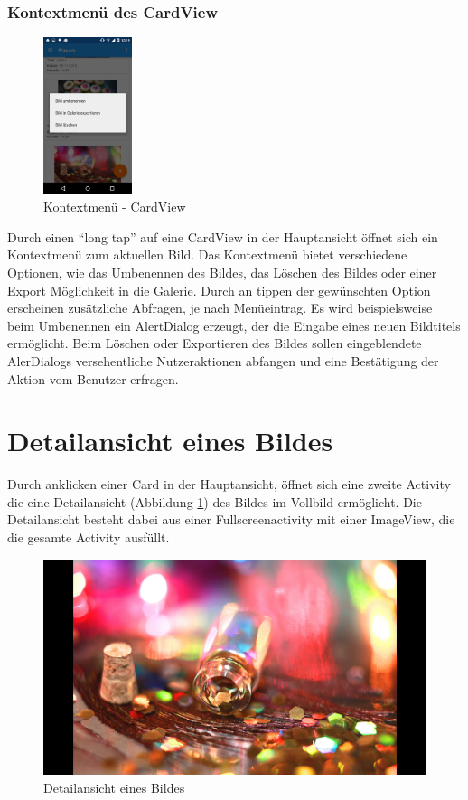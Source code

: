 \subsubsection{Kontextmenü des CardView}

\begin{figure}
	\centering
   \includegraphics[width=0.23\textwidth]{images/screenshots/contextmenu.png}
  \caption{Kontextmenü - CardView}
\end{figure}
  
Durch einen \enquote{long tap} auf eine CardView in der Hauptansicht öffnet sich ein Kontextmenü zum aktuellen Bild. Das Kontextmenü bietet verschiedene Optionen, wie das Umbenennen des Bildes, das Löschen des Bildes oder einer Export Möglichkeit in die Galerie. Durch an tippen der gewünschten Option erscheinen zusätzliche Abfragen, je nach Menüeintrag. Es wird beispielsweise beim Umbenennen ein AlertDialog erzeugt, der die Eingabe eines neuen Bildtitels ermöglicht. Beim Löschen oder Exportieren des Bildes sollen eingeblendete AlerDialogs versehentliche Nutzeraktionen abfangen und eine Bestätigung der Aktion vom Benutzer erfragen.

\section{Detailansicht eines Bildes}
Durch anklicken einer Card in der Hauptansicht, öffnet sich eine zweite Activity die eine Detailansicht (Abbildung \ref{label:fullscreenview}) des Bildes im Vollbild ermöglicht. Die Detailansicht besteht dabei aus einer Fullscreenactivity mit einer ImageView, die die gesamte Activity ausfüllt.
\begin{figure}[H]
\centering
\includegraphics[scale=0.09]{images/screenshots/fullscreenview.png}
\caption{Detailansicht eines Bildes}
\label{label:fullscreenview}
\end{figure}


